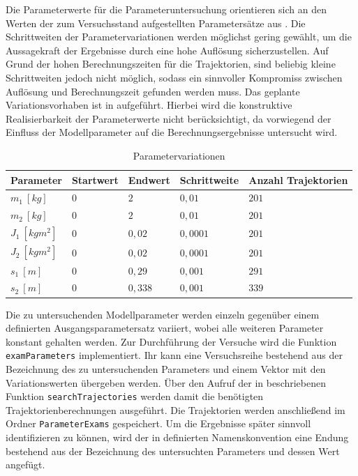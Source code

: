 Die Parameterwerte für die Parameteruntersuchung orientieren sich an den Werten der zum Versuchsstand aufgestellten Parametersätze aus . Die Schrittweiten der Parametervariationen werden möglichst gering gewählt, um die Aussagekraft der Ergebnisse durch eine hohe Auflösung sicherzustellen. Auf Grund der hohen Berechnungszeiten für die Trajektorien, sind beliebig kleine Schrittweiten jedoch nicht möglich, sodass ein sinnvoller Kompromiss zwischen Auflösung und Berechnungszeit gefunden werden muss. Das geplante Variationsvorhaben ist in  aufgeführt. Hierbei wird die konstruktive Realisierbarkeit der Parameterwerte nicht berücksichtigt, da vorwiegend der Einfluss der Modellparameter auf die Berechnungsergebnisse untersucht wird.
\begin{table}[h]
	\centering
	\caption{Parametervariationen}
		\begin{tabular}{lllll}
			Parameter & Startwert & Endwert & Schrittweite & Anzahl Trajektorien \\
			\midrule
			$m_1 \ [\unit{kg}]$     & $0$ & $2$    & $0,01$   & $201$ \\
			$m_2 \ [\unit{kg}]$     & $0$ & $2$    & $0,01$   & $201$ \\
			$J_1 \ [\unit{kgm^2}]$  & $0$ & $0,02$ & $0,0001$ & $201$ \\
			$J_2 \ [\unit{kgm^2}]$  & $0$ & $0,02$ & $0,0001$ & $201$ \\
		  $s_1 \ [\unit{m}]$      & $0$ & $0,29$ & $0,001$  & $291$ \\
			$s_2 \ [\unit{m}]$      & $0$ & $0,338$& $0,001$  & $339$ \\
			\bottomrule
		\end{tabular}
	\label{tab:Parametervariationen}
\end{table}

Die zu untersuchenden Modellparameter werden einzeln gegenüber einem definierten Ausgangsparametersatz variiert, wobei alle weiteren Parameter konstant gehalten werden. Zur Durchführung der Versuche wird die Funktion \texttt{examParameters} implementiert. Ihr kann eine Versuchsreihe bestehend aus der Bezeichnung des zu untersuchenden Parameters und einem Vektor mit den Variationswerten übergeben werden. Über den Aufruf der in  beschriebenen Funktion \texttt{searchTrajectories} werden damit die benötigten Trajektorienberechnungen ausgeführt. Die Trajektorien werden anschließend im Ordner \texttt{ParameterExams} gespeichert. Um die Ergebnisse später sinnvoll identifizieren zu können, wird der in  definierten Namenskonvention eine Endung bestehend aus der Bezeichnung des untersuchten Parameters und dessen Wert angefügt. 

